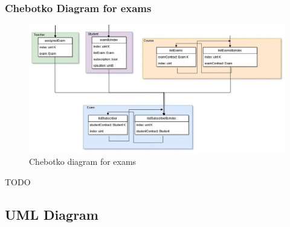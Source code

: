 \documentclass[ManualeSviluppatore]{subfiles}
\begin{document}
\subsubsection{Chebotko Diagram for exams}
\begin{figure}[H]
	\centering
	\includegraphics[width=1\linewidth]{"diagrammi/chebotko/exam"}
	\caption{Chebotko diagram for exams}
	\label{fig:Chebotko diagram for exams}
\end{figure}
TODO

\subsection{UML Diagram}
\end{document}
